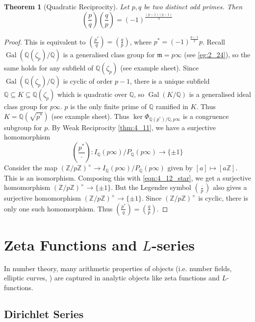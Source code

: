 \documentclass[11pt]{article}
\theoremstyle{definition}
\theoremstyle{plain}
\newtheorem{theorem}[definition]{Theorem}
\theoremstyle{remark}
\DeclareMathOperator{\Gal}{Gal}
\newcommand{\ZZ}{\mathbb{Z}}
\newcommand{\QQ}{\mathbb{Q}}
\newcommand{\fm}{\mathfrak{m}}
\newcommand{\leg}[2]{\left(\frac{#1}{#2}\right)}
\begin{document}
\begin{theorem}[Quadratic Reciprocity]\label{thm:4_12}
    Let $p, q$ be two distinct odd primes. Then
    \begin{equation*}
        \leg{p}{q} \leg{q}{p} = (-1)^{\frac{(p-1)(q-1)}{4}}
    \end{equation*}
\end{theorem}
\begin{proof}
    This is equivalent to $\leg{p^*}{q} = \leg{q}{p}$, where $p^* = (-1)^{\frac{p-1}{2}} p$. Recall $\Gal(\QQ(\zeta_p)/\QQ)$ is a generalised class group for $\fm = p \infty$ (see \autoref{eg:2_24}), so the same holds for any subfield of $\QQ(\zeta_p)$ (see example sheet). Since $\Gal(\QQ(\zeta_p)/\QQ)$ is cyclic of order $p-1$, there is a unique subfield $\QQ \subseteq K \subseteq \QQ(\zeta_p)$ which is quadratic over $\QQ$, so $\Gal(K/\QQ)$ is a generalised ideal class group for $p \infty$. $p$ is the only finite prime of $\QQ$ ramified in $K$. Thus $K = \QQ(\sqrt{p^*})$ (see example sheet). Thus $\ker \Phi_{\QQ(p^*)/\QQ, p \infty}$ is a congruence subgroup for $p$. By Weak Reciprocity \autoref{thm:4_11}, %
    we have a surjective homomorphism
    \begin{equation}\label{eqn:4_12_star}
        \leg{p^*}{\cdot} : I_\QQ(p \infty) / P_\QQ(p \infty) \to \{\pm 1\}
    \end{equation}
    Consider the map $(\ZZ / p \ZZ)^\times \to I_\QQ(p\infty)/P_\QQ(p\infty)$ given by $[a] \mapsto [a \ZZ]$. This is an isomorphism. Composing this with \eqref{eqn:4_12_star}, we get a surjective homomorphism $(\ZZ/p\ZZ)^\times \to \{\pm 1\}$. But the Legendre symbol $\leg{\cdot}{p}$ also gives a surjective homomorphism $(\ZZ/p\ZZ)^\times \to \{\pm 1\}$. Since $(\ZZ/p\ZZ)^\times$ is cyclic, there is only one such homomorphism. Thus $\leg{p^*}{q} = \leg{q}{p}$.
\end{proof}

\section{Zeta Functions and \texorpdfstring{$L$}{L}-series}

In number theory, many arithmetic properties of objects (i.e. number fields, elliptic curves, \textellipsis) are captured in analytic objects like zeta functions and $L$-functions.

\subsection{Dirichlet Series}
\end{document}
